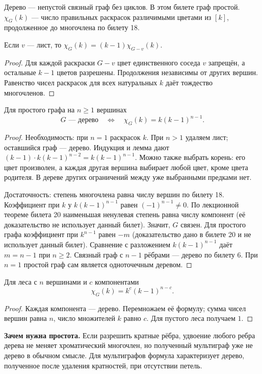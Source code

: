 \begin{definition}
Дерево — непустой связный граф без циклов. В этом билете граф простой.
\(\chi_G(k)\) — число правильных раскрасок различимыми цветами из \([k]\),
продолженное до многочлена по билету 18.
\end{definition}
\begin{lemma}
Если \(v\) — лист, то \(\chi_G(k)=(k-1)\chi_{G-v}(k)\).
\end{lemma}
\begin{proof}
Для каждой раскраски \(G-v\) цвет единственного соседа \(v\) запрещён,
а остальные \(k-1\) цветов разрешены. Продолжения независимы от других вершин.
Равенство чисел раскрасок для всех натуральных \(k\) даёт тождество многочленов.
\end{proof}
\begin{theorem}
Для простого графа на \(n\ge1\) вершинах
\[
 \boxed{G\text{ — дерево}\quad\Longleftrightarrow\quad
 \chi_G(k)=k(k-1)^{n-1}.}
\]
\end{theorem}
\begin{proof}
Необходимость: при \(n=1\) раскрасок \(k\). При \(n>1\) удаляем лист;
оставшийся граф — дерево. Индукция и лемма дают
\((k-1)\cdot k(k-1)^{n-2}=k(k-1)^{n-1}\).
Можно также выбрать корень: его цвет произволен, а каждая другая
вершина выбирает любой цвет, кроме цвета родителя. В дереве других
ограничений между уже выбранными предками нет.

Достаточность: степень многочлена равна числу вершин по билету 18.
Коэффициент при \(k\) у \(k(k-1)^{n-1}\) равен \((-1)^{n-1}\ne0\).
По лекционной теореме билета 20 наименьшая ненулевая степень равна
числу компонент (её доказательство не использует данный билет).
Значит, \(G\) связен.
Для простого графа коэффициент при \(k^{n-1}\) равен \(-m\)
(доказательство дано в билете 20 и не использует данный билет).
Сравнение с разложением \(k(k-1)^{n-1}\) даёт \(m=n-1\)
при \(n\ge2\). Связный граф с \(n-1\) рёбрами — дерево по билету 6.
При \(n=1\) простой граф сам является одноточечным деревом.
\end{proof}


\begin{cor}
Для леса с \(n\) вершинами и \(c\) компонентами
\[
 \chi_G(k)=k^c(k-1)^{n-c}.
\]
\end{cor}
\begin{proof}
Каждая компонента — дерево. Перемножаем её формулу;
сумма чисел вершин равна \(n\), число множителей \(k\) равно \(c\).
Для пустого леса получаем \(1\).
\end{proof}
\textbf{Зачем нужна простота.} Если разрешить кратные рёбра, удвоение
любого ребра дерева не меняет хроматический многочлен, но полученный
мультиграф уже не дерево в обычном смысле. Для мультиграфов формула
характеризует дерево, полученное после удаления кратностей, при отсутствии петель.
